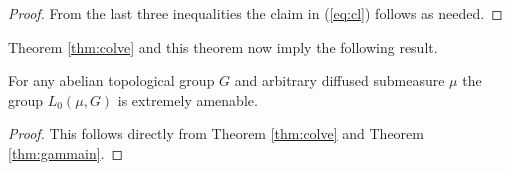 \begin{proof}
  From the last three inequalities the claim in (\ref{eq:cl}) follows as needed.
\end{proof}

Theorem \ref{thm:colve} and this theorem now imply the following result.

\begin{thm}
  For any abelian topological group $G$ and arbitrary diffused submeasure $\mu$ the group $L_0(\mu, G)$ is extremely amenable.
\end{thm}

\begin{proof}
  This follows directly from Theorem \ref{thm:colve} and Theorem \ref{thm:gammain}.
\end{proof}
